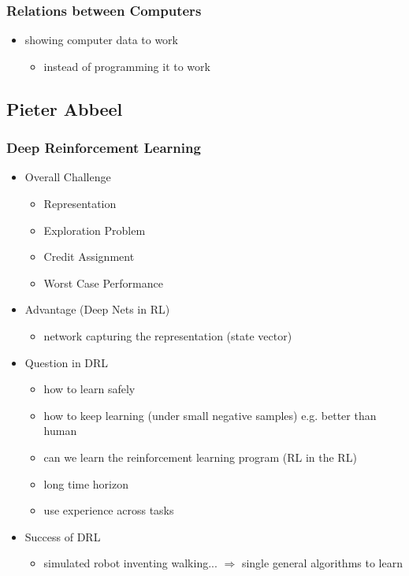 \subsubsection{Relations between Computers}
\begin{itemize}
\item showing computer data to work
	\begin{itemize}
	\item instead of programming it to work
	\end{itemize}
\end{itemize}


\subsection{Pieter Abbeel}
\subsubsection{Deep Reinforcement Learning}
\begin{itemize}
\item Overall Challenge 
	\begin{itemize}
	\item Representation
	\item Exploration Problem
	\item Credit Assignment
	\item Worst Case Performance
	\end{itemize}
\item Advantage (Deep Nets in RL)
	\begin{itemize}
	\item network capturing the representation (state vector)
	\end{itemize}
\item Question in DRL
	\begin{itemize}
	\item how to learn safely
	\item how to keep learning (under small negative samples) e.g. better than human
	\item can we learn the reinforcement learning program (RL in the RL)
	\item long time horizon
	\item use experience across tasks
	\end{itemize}
\item Success of DRL
	\begin{itemize}
	\item simulated robot inventing walking... $\Rightarrow$ single general algorithms to learn
	\end{itemize}
\end{itemize}

